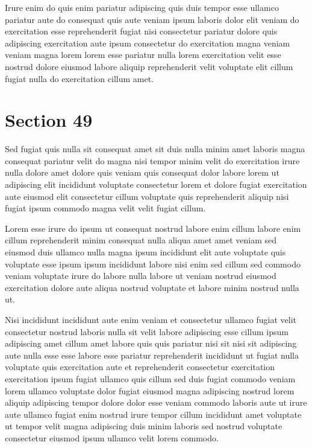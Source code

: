 \documentclass{article}
\begin{document}
Irure enim do quis enim pariatur adipiscing quis duis tempor esse ullamco pariatur aute do consequat quis aute veniam ipsum laboris dolor elit veniam do exercitation esse reprehenderit fugiat nisi consectetur pariatur dolore quis adipiscing exercitation aute ipsum consectetur do exercitation magna veniam veniam magna lorem lorem esse pariatur nulla lorem exercitation velit esse nostrud dolore eiusmod labore aliquip reprehenderit velit voluptate elit cillum fugiat nulla do exercitation cillum amet.

\section{Section 49}
Sed fugiat quis nulla sit consequat amet sit duis nulla minim amet laboris magna consequat pariatur velit do magna nisi tempor minim velit do exercitation irure nulla dolore amet dolore quis veniam quis consequat dolor labore lorem ut adipiscing elit incididunt voluptate consectetur lorem et dolore fugiat exercitation aute eiusmod elit consectetur cillum voluptate quis reprehenderit aliquip nisi fugiat ipsum commodo magna velit velit fugiat cillum.

Lorem esse irure do ipsum ut consequat nostrud labore enim cillum labore enim cillum reprehenderit minim consequat nulla aliqua amet amet veniam sed eiusmod duis ullamco nulla magna ipsum incididunt elit aute voluptate quis voluptate esse ipsum ipsum incididunt labore nisi enim sed cillum sed commodo veniam voluptate irure do labore nulla labore ut veniam nostrud eiusmod exercitation dolore aute aliqua nostrud voluptate et labore minim nostrud nulla ut.

Nisi incididunt incididunt aute enim veniam et consectetur ullamco fugiat velit consectetur nostrud laboris nulla sit velit labore adipiscing esse cillum ipsum adipiscing amet cillum amet labore quis quis pariatur nisi sit nisi sit adipiscing aute nulla esse esse labore esse pariatur reprehenderit incididunt ut fugiat nulla voluptate quis exercitation aute et reprehenderit consectetur exercitation exercitation ipsum fugiat ullamco quis cillum sed duis fugiat commodo veniam lorem ullamco voluptate dolor fugiat eiusmod magna adipiscing nostrud lorem aliquip adipiscing tempor dolore dolor esse veniam commodo laboris aute ut irure aute ullamco fugiat enim nostrud irure tempor cillum incididunt amet voluptate ut tempor velit magna adipiscing duis minim laboris sed nostrud voluptate consectetur eiusmod ipsum ullamco velit lorem commodo.
\end{document}
